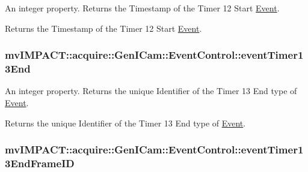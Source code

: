 An integer property. Returns the Timestamp of the Timer 12 Start \hyperlink{classmv_i_m_p_a_c_t_1_1acquire_1_1_event}{Event}. 

Returns the Timestamp of the Timer 12 Start \hyperlink{classmv_i_m_p_a_c_t_1_1acquire_1_1_event}{Event}. \hypertarget{classmv_i_m_p_a_c_t_1_1acquire_1_1_gen_i_cam_1_1_event_control_a26c759bbe5d97ef5198738153d6786a7}{
\subsubsection[{event\+Timer13\+End}]{ mv\+I\+M\+P\+A\+C\+T\+::acquire\+::\+Gen\+I\+Cam\+::\+Event\+Control\+::event\+Timer13\+End}}\label{classmv_i_m_p_a_c_t_1_1acquire_1_1_gen_i_cam_1_1_event_control_a26c759bbe5d97ef5198738153d6786a7}


An integer property. Returns the unique Identifier of the Timer 13 End type of \hyperlink{classmv_i_m_p_a_c_t_1_1acquire_1_1_event}{Event}. 

Returns the unique Identifier of the Timer 13 End type of \hyperlink{classmv_i_m_p_a_c_t_1_1acquire_1_1_event}{Event}. \hypertarget{classmv_i_m_p_a_c_t_1_1acquire_1_1_gen_i_cam_1_1_event_control_a5eea49848730209fabcd3c1019c482b5}{
\subsubsection[{event\+Timer13\+End\+Frame\+I\+D}]{ mv\+I\+M\+P\+A\+C\+T\+::acquire\+::\+Gen\+I\+Cam\+::\+Event\+Control\+::event\+Timer13\+End\+Frame\+I\+D}}\label{classmv_i_m_p_a_c_t_1_1acquire_1_1_gen_i_cam_1_1_event_control_a5eea49848730209fabcd3c1019c482b5}


